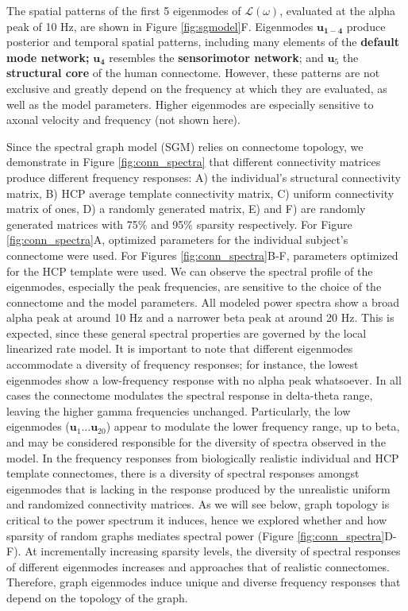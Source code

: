 The spatial patterns of the first 5 eigenmodes of
$\mathcal{L}(\omega)$, evaluated at the alpha peak of 10 Hz, are shown
in Figure \ref{fig:sgmodel}F. Eigenmodes
$\mathbf{u}_{\mathbf{1 - 4}}$ produce posterior and temporal spatial
patterns, including many elements of the \textbf{default mode network;}
\(\mathbf{u}_{\mathbf{4}}\) resembles the \textbf{sensorimotor network};
and \(\mathbf{u}_{5}\) the \textbf{structural core} of the human
connectome. However, these patterns are not exclusive and greatly depend
on the frequency at which they are evaluated, as well as the model
parameters. Higher eigenmodes are especially sensitive to axonal
velocity and frequency (not shown here).

Since the spectral graph model (SGM) relies on connectome topology, we
demonstrate in Figure \ref{fig:conn_spectra} that different connectivity matrices
produce different frequency responses: A) the individual's structural
connectivity matrix, B) HCP average template connectivity matrix, C)
uniform connectivity matrix of ones, D) a randomly generated matrix, E)
and F) are randomly generated matrices with 75\% and 95\% sparsity
respectively. For Figure \ref{fig:conn_spectra}A, optimized parameters for the individual
subject's connectome were used. For Figures \ref{fig:conn_spectra}B-F, parameters optimized
for the HCP template were used. We can observe the spectral profile of
the eigenmodes, especially the peak frequencies, are sensitive to the
choice of the connectome and the model parameters. All modeled power
spectra show a broad alpha peak at around 10 Hz and a narrower beta peak
at around 20 Hz. This is expected, since these general spectral
properties are governed by the local linearized rate model. It is
important to note that different eigenmodes accommodate a diversity of
frequency responses; for instance, the lowest eigenmodes show a
low-frequency response with no alpha peak whatsoever. In all cases the connectome modulates the spectral response in delta-theta range, leaving the higher gamma frequencies unchanged. Particularly, the low eigenmodes ($\mathbf{u}_1 \ldots \mathbf{u}_{20}$) appear to modulate the lower frequency range, up to beta, and may be considered responsible for the diversity of spectra observed in the model. In the frequency
responses from biologically realistic individual and HCP template
connectomes, there is a diversity of spectral responses amongst
eigenmodes that is lacking in the response produced by the unrealistic
uniform and randomized connectivity matrices. As we will see below, graph topology is
critical to the power spectrum it induces, hence we explored whether and
how sparsity of random graphs mediates spectral power (Figure \ref{fig:conn_spectra}D-F). At incrementally increasing sparsity levels, the diversity of
spectral responses of different eigenmodes increases and approaches that
of realistic connectomes. Therefore, graph eigenmodes induce unique and
diverse frequency responses that depend on the topology of the graph.

